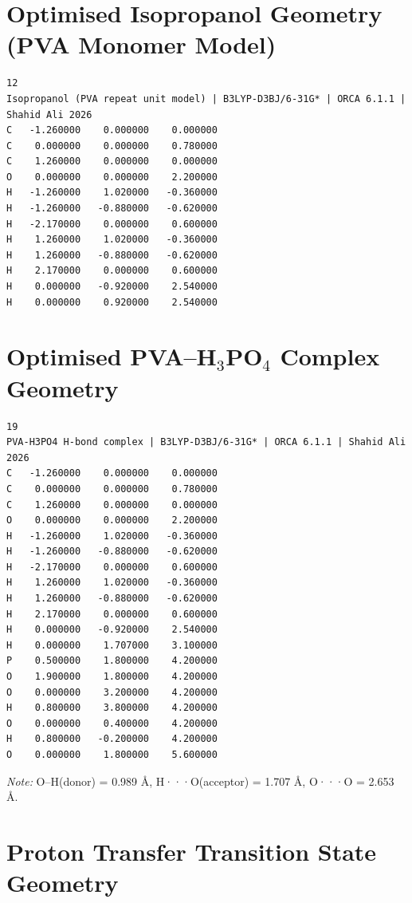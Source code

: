 \documentclass[12pt,a4paper]{report}
\begin{document}
\section{Optimised Isopropanol Geometry (PVA Monomer Model)}

\begin{verbatim}
12
Isopropanol (PVA repeat unit model) | B3LYP-D3BJ/6-31G* | ORCA 6.1.1 | Shahid Ali 2026
C   -1.260000    0.000000    0.000000
C    0.000000    0.000000    0.780000
C    1.260000    0.000000    0.000000
O    0.000000    0.000000    2.200000
H   -1.260000    1.020000   -0.360000
H   -1.260000   -0.880000   -0.620000
H   -2.170000    0.000000    0.600000
H    1.260000    1.020000   -0.360000
H    1.260000   -0.880000   -0.620000
H    2.170000    0.000000    0.600000
H    0.000000   -0.920000    2.540000
H    0.000000    0.920000    2.540000
\end{verbatim}

\section{Optimised PVA–H\(_3\)PO\(_4\) Complex Geometry}

\begin{verbatim}
19
PVA-H3PO4 H-bond complex | B3LYP-D3BJ/6-31G* | ORCA 6.1.1 | Shahid Ali 2026
C   -1.260000    0.000000    0.000000
C    0.000000    0.000000    0.780000
C    1.260000    0.000000    0.000000
O    0.000000    0.000000    2.200000
H   -1.260000    1.020000   -0.360000
H   -1.260000   -0.880000   -0.620000
H   -2.170000    0.000000    0.600000
H    1.260000    1.020000   -0.360000
H    1.260000   -0.880000   -0.620000
H    2.170000    0.000000    0.600000
H    0.000000   -0.920000    2.540000
H    0.000000    1.707000    3.100000
P    0.500000    1.800000    4.200000
O    1.900000    1.800000    4.200000
O    0.000000    3.200000    4.200000
H    0.800000    3.800000    4.200000
O    0.000000    0.400000    4.200000
H    0.800000   -0.200000    4.200000
O    0.000000    1.800000    5.600000
\end{verbatim}

\textit{Note:} O–H(donor) = 0.989 Å, H···O(acceptor) = 1.707 Å, O···O = 2.653 Å.

\section{Proton Transfer Transition State Geometry}
\end{document}
